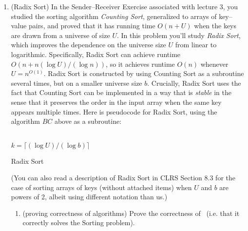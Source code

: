 \documentclass[11pt]{article}
\begin{document}
\begin{enumerate}
\begin{enumerate}
\end{enumerate}
\newpage

\item (Radix Sort) In the Sender--Receiver Exercise associated with lecture 3, you studied the sorting algorithm {\em Counting Sort}, generalized to arrays of key--value pairs, and proved that it has running time $O(n+U)$ when the keys are drawn from a universe of size $U$. In this problem you'll study {\em Radix Sort}, which improves the dependence on the universe size $U$ from linear to logarithmic.  Specifically, Radix Sort can achieve runtime $O(n+n(\log U)/(\log n))$, so it achieves runtime $O(n)$ whenever $U = n^{O(1)}$.  
Radix Sort is constructed by using Counting Sort as a subroutine several times, but on a smaller universe size $b$.
Crucially, Radix Sort uses the fact that Counting Sort can be implemented in a way that is {\em stable} in the sense that it preserves the order in the input array when the same key appears multiple times.  Here is pseudocode for Radix Sort, using the algorithm $BC$ above as a subroutine:

\begin{algorithm}[H]
\\
$k=\lceil (\log U)/(\log b)\rceil$\;
\caption{Radix Sort}
\end{algorithm}

(You can also read a description of Radix Sort in CLRS Section 8.3 for the case of sorting arrays of keys (without attached items) when $U$ and $b$ are powers of 2, albeit using different notation than us.)

        \begin{enumerate}
        
            \item (proving correctness of algorithms) Prove the correctness of \RadixSort\ (i.e. that it correctly solves the Sorting problem). 
            

\end{enumerate}
\end{enumerate}
\end{document}

